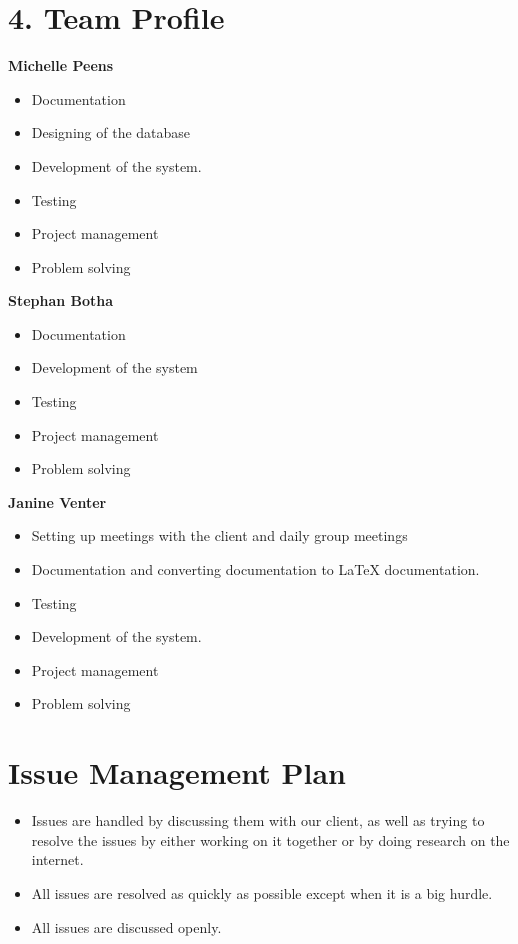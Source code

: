 \documentclass[29pt,a4paper]{moderncv}
\begin{document}
	\vspace{5mm}

\newpage
	\section*{4. Team Profile}
	\noindent\textbf{Michelle Peens}
		\begin{itemize}
			\item Documentation
			\item Designing of the database
			\item Development of the system.
			\item Testing
			\item Project management
			\item Problem solving\\
		\end{itemize}
	
	\noindent\textbf{Stephan Botha}
		\begin{itemize}
			\item Documentation
			\item Development of the system
			\item Testing
			\item Project management
			\item Problem solving\\
		\end{itemize}
	
	\noindent\textbf{Janine Venter}
		\begin{itemize}
			\item Setting up meetings with the client and daily group meetings
			\item Documentation and converting documentation to LaTeX documentation.
			\item Testing
			\item Development of the system.
			\item Project management
			\item Problem solving
		\end{itemize}
\newpage
		\section*{Issue Management Plan}
		\begin{itemize}
			\item Issues are handled by discussing them with our client, as well as trying to resolve the issues by either working on it together or by doing research on the internet.
			\item All issues are resolved as quickly as possible except when it is a big hurdle. 
			\item All issues are discussed openly.
		\end{itemize}
		
\end{document}
